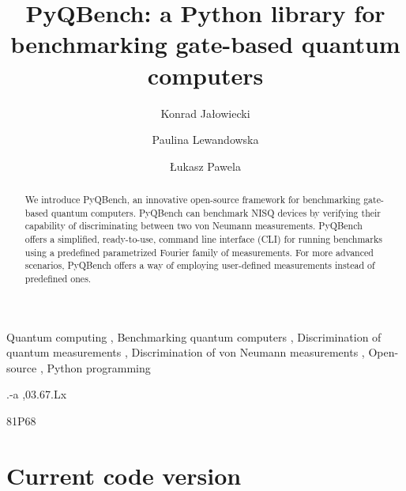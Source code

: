 \documentclass[preprint,12pt, a4paper, dvipsnames]{elsarticle}
\newcommand{\1}{{\rm 1\hspace{-0.9mm}l}}
\theoremstyle{definition}
\begin{document}
\begin{frontmatter}

\title{PyQBench: a Python library for benchmarking gate-based quantum computers}

\author{Konrad Jałowiecki}

\author{Paulina Lewandowska}
\author{\L ukasz Pawela}

\address{Institute of Theoretical and Applied Informatics, Polish Academy
	of Sciences, Ba{\l}tycka~5, 44-100 Gliwice, Poland}

\begin{abstract}
We introduce PyQBench, an innovative open-source framework for benchmarking
gate-based quantum computers. PyQBench can benchmark NISQ devices by verifying their capability of
discriminating between two von Neumann measurements. PyQBench offers a simplified, ready-to-use,
command line interface (CLI) for running benchmarks using a predefined parametrized Fourier
family of measurements. For more advanced scenarios, PyQBench offers a way of employing user-defined
measurements instead of predefined ones.

\end{abstract}

\begin{keyword}
Quantum computing \sep
Benchmarking quantum computers \sep
Discrimination of quantum measurements \sep
Discrimination of von Neumann measurements \sep
Open-source \sep
Python programming

.-a \sep 03.67.Lx

\MSC 81P68

\end{keyword}

\end{frontmatter}

\section*{Current code version}
\label{}
\end{document}
